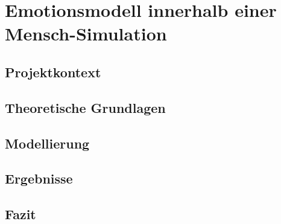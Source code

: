 \chapter{Emotionsmodell innerhalb einer Mensch-Simulation}
\section{Projektkontext}
\section{Theoretische Grundlagen}
\section{Modellierung}
\section{Ergebnisse}
\section{Fazit}
